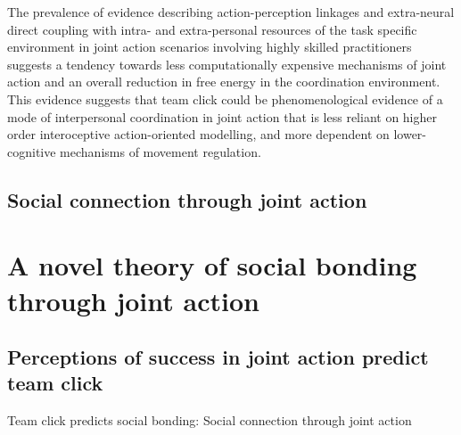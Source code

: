 \begin{CJK}{UTF8}{gbsn}
The prevalence of evidence describing action-perception linkages and extra-neural direct coupling with intra- and extra-personal resources of the task specific environment in joint action scenarios involving highly skilled practitioners suggests a tendency towards less computationally expensive mechanisms of joint action and an overall reduction in free energy in the coordination environment.  This evidence suggests that team click could be phenomenological evidence of a mode of interpersonal coordination in joint action that is less reliant on higher order interoceptive action-oriented modelling, and more dependent on lower-cognitive mechanisms of movement regulation.


\subsection{Social connection through joint action}






























\section{A novel theory of social bonding through joint action}

\subsection{Perceptions of success in joint action predict team click}

Team click predicts social bonding: Social connection through joint action\label{sect:DVsocialBonding}


\end{CJK}
